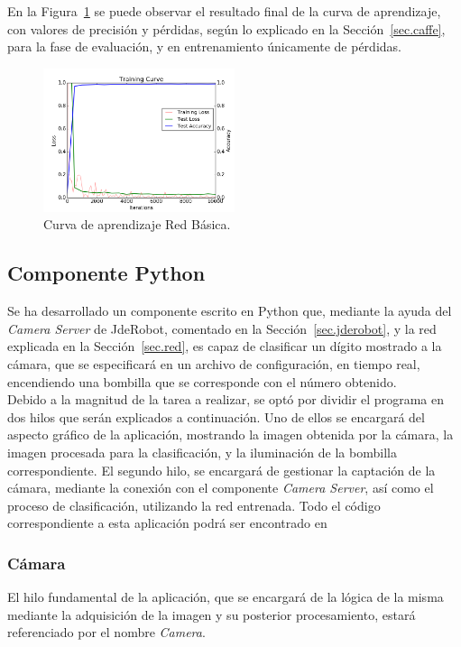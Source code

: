 	En la Figura~\ref{fig.Log} se puede observar el resultado final de la curva de aprendizaje, con valores de precisión y pérdidas, según lo explicado en la Sección~\ref{sec.caffe}, para la fase de evaluación, y en entrenamiento únicamente de pérdidas.
	
	\begin{figure}[H]
		\begin{center}
			\includegraphics[width=0.5\textwidth]{figures/RedBasicaLog}
			\caption{Curva de aprendizaje Red Básica.}
			\label{fig.Log}
		\end{center}
	\end{figure}

\subsection{Componente Python} \label{sec.componente}
Se ha desarrollado un componente escrito en Python que, mediante la ayuda del \textit{Camera Server} de JdeRobot, comentado en la Sección~\ref{sec.jderobot},  y la red explicada en la Sección~\ref{sec.red}, es capaz de clasificar un dígito mostrado a la cámara, que se especificará en un archivo de configuración, en tiempo real, encendiendo una bombilla que se corresponde con el número obtenido.\\

Debido a la magnitud de la tarea a realizar, se optó por dividir el programa en dos hilos que serán explicados a continuación. Uno de ellos se encargará del aspecto gráfico de la aplicación, mostrando la imagen obtenida por la cámara, la imagen procesada para la clasificación, y la iluminación de la bombilla correspondiente. El segundo hilo, se encargará de gestionar la captación de la cámara, mediante la conexión con el componente \textit{Camera Server}, así como el proceso de clasificación, utilizando la red entrenada. Todo el código correspondiente a esta aplicación podrá ser encontrado en~\cite{codigo}
\subsubsection{Cámara} \label{sec.camara}
El hilo fundamental de la aplicación, que se encargará de la lógica de la misma mediante la adquisición de la imagen y su posterior procesamiento, estará referenciado por el nombre \textit{Camera}.\\

